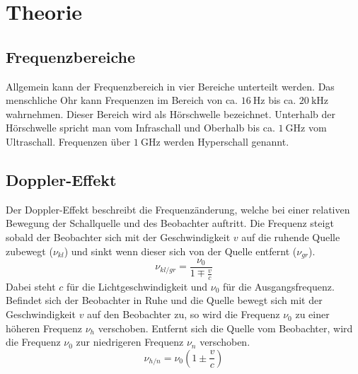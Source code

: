 \section{Theorie}

\subsection{Frequenzbereiche}
Allgemein kann der Frequenzbereich in vier Bereiche unterteilt werden.
Das menschliche Ohr kann Frequenzen im Bereich von ca. $\SI{16}{\hertz}$ bis ca. $\SI{20}{\kilo\hertz}$ wahrnehmen.
Dieser Bereich wird als Hörschwelle bezeichnet.
Unterhalb der Hörschwelle spricht man vom Infraschall und Oberhalb bis ca. $\SI{1}{\giga\hertz}$ vom Ultraschall.
Frequenzen über $\SI{1}{\giga\hertz}$ werden Hyperschall genannt.

\subsection{Doppler-Effekt}
Der Doppler-Effekt beschreibt die Frequenzänderung, welche bei einer relativen Bewegung der Schallquelle und des Beobachter auftritt.
Die Frequenz steigt sobald der Beobachter sich mit der Geschwindigkeit $v$ auf die ruhende Quelle zubewegt ($\nu_{kl}$) und sinkt wenn dieser sich von der Quelle entfernt ($\nu_{gr}$).
\begin{equation}
    \nu_{kl/gr} = \frac{\nu_0}{1\mp \frac{v}{c}}
    \label{eqn:doppler_beobachter}
\end{equation}
Dabei steht $c$ für die Lichtgeschwindigkeit und $\nu_0$ für die Ausgangsfrequenz.
\\
Befindet sich der Beobachter in Ruhe und die Quelle bewegt sich mit der Geschwindigkeit $v$ auf den Beobachter zu, so wird die Frequenz $\nu_0$ zu einer höheren Frequenz $\nu_h$ verschoben.
Entfernt sich die Quelle vom Beobachter, wird die Frequenz $\nu_0$ zur niedrigeren Frequenz $\nu_n$ verschoben.
\begin{equation}
    \nu_{h/n} = \nu_0 \left ( 1 \pm \frac{v}{c}  \right )
    \label{eqn:doppler_quelle}
\end{equation}

